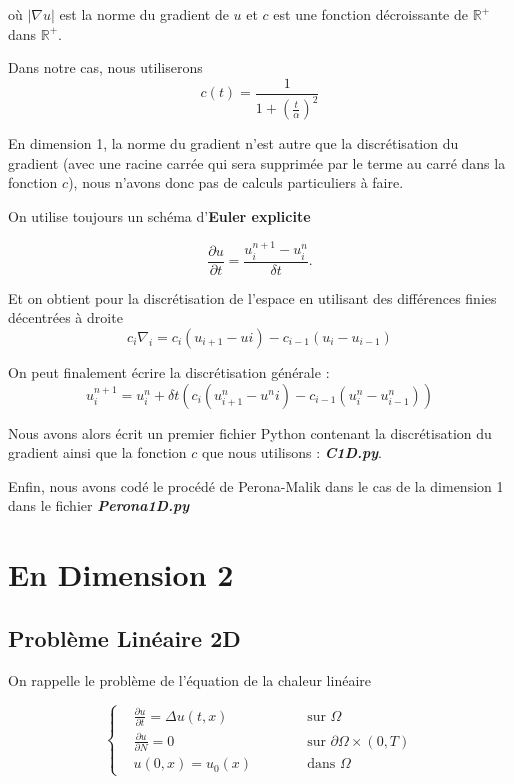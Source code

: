 \documentclass[a4paper,12pt,twoside]{report}
\newcommand{\R}{\mathbb{R}}
\newcommand{\1}{\mathbb{1}}
\begin{document}
	où $\left|\nabla u\right|$ est la norme du gradient de $u$ et $c$ est une fonction décroissante de $\R^+$ dans $\R^+$. 
	
	Dans notre cas, nous utiliserons 
	\[
	c(t) = \displaystyle\frac{1}{1+\left(\frac{t}{\alpha}\right)^2}	
	\]
	
	En dimension 1, la norme du gradient n'est autre que la discrétisation du gradient (avec une racine carrée qui sera supprimée par le terme au carré dans la fonction $c$), nous n'avons donc pas de calculs particuliers à faire. 
	
	On utilise toujours un schéma d'\textbf{Euler explicite}
	
	\begin{equation*}
	\frac{\partial u}{\partial t}=\frac{u^{n+1}_{i}-u^{n}_{i}}{\delta t}.
	\end{equation*}
	
	Et on obtient pour la discrétisation de l'espace en utilisant des différences finies décentrées à droite
	\[
	c_{i}\nabla_{i} = c_i\left(u_{i+1} - u{i}\right) - c_{i-1}\left(u_i - u_{i-1}\right)
	\]
	
	On peut finalement écrire la discrétisation générale : 
	\[
	u^{n+1}_i = u^n_i + \delta t\left(c_i\left(u^n_{i+1} - u^n{i}\right) - c_{i-1}\left(u^n_i - u^n_{i-1}\right)\right)
	\]
	
	Nous avons alors écrit un premier fichier Python contenant la discrétisation du gradient ainsi que la fonction $c$ que nous utilisons : \emph{\textbf{C1D.py}}.
	
	
	Enfin, nous avons codé le procédé de Perona-Malik dans le cas de la dimension 1 dans le fichier \emph{\textbf{Perona1D.py}}
	
	
	
	
	\chapter*{En Dimension 2}
	
	\section*{Problème Linéaire 2D}
	
	On rappelle le problème de l'équation de la chaleur linéaire 
	
	\begin{equation}
	\left\{
	\begin{aligned}
	&\frac{\partial u}{\partial t}=\Delta u(t,x) &\qquad &\text{ sur } \Omega \\
	&\frac{\partial u}{\partial N} = 0 &\qquad &\text{ sur } \partial \Omega \times \left(0,T\right) \\
	&u(0,x) = u_0(x) &\qquad &\text{ dans } \Omega
	\end{aligned}
	\right.
	\end{equation}
	
\end{document}
